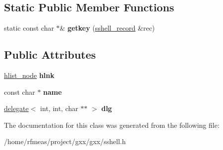 \subsection*{Static Public Member Functions}
\begin{DoxyCompactItemize}
\item 
static const char $\ast$\& {\bfseries getkey} (\hyperlink{classgxx_1_1sshell__record}{sshell\+\_\+record} \&rec)\hypertarget{classgxx_1_1sshell__record_a3729dfb700a5903b26ae6a3c98d46742}{}\label{classgxx_1_1sshell__record_a3729dfb700a5903b26ae6a3c98d46742}

\end{DoxyCompactItemize}
\subsection*{Public Attributes}
\begin{DoxyCompactItemize}
\item 
\hyperlink{structhlist__node}{hlist\+\_\+node} {\bfseries hlnk}\hypertarget{classgxx_1_1sshell__record_a5d8593f84349192f6f0c349b37f78d0d}{}\label{classgxx_1_1sshell__record_a5d8593f84349192f6f0c349b37f78d0d}

\item 
const char $\ast$ {\bfseries name}\hypertarget{classgxx_1_1sshell__record_a821691a7d0fe3e127dd207d32d3705dd}{}\label{classgxx_1_1sshell__record_a821691a7d0fe3e127dd207d32d3705dd}

\item 
\hyperlink{classgxx_1_1delegate}{delegate}$<$ int, int, char $\ast$$\ast$ $>$ {\bfseries dlg}\hypertarget{classgxx_1_1sshell__record_a0bf2b4e5e06e611e1fc8b540262fc193}{}\label{classgxx_1_1sshell__record_a0bf2b4e5e06e611e1fc8b540262fc193}

\end{DoxyCompactItemize}


The documentation for this class was generated from the following file\+:\begin{DoxyCompactItemize}
\item 
/home/rfmeas/project/gxx/gxx/sshell.\+h\end{DoxyCompactItemize}
